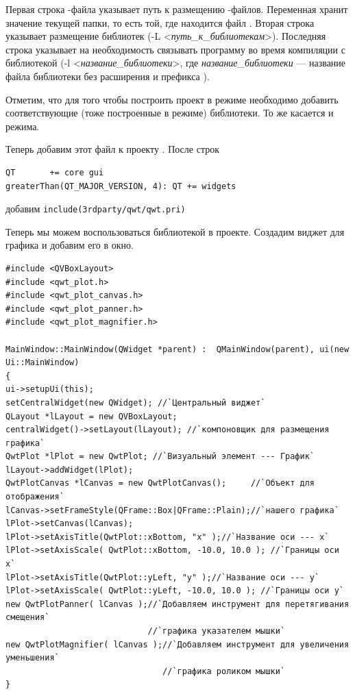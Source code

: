 Первая строка -файла указывает путь к размещению
-файлов. Переменная 
 хранит значение текущей папки, то есть той, где
находится файл . Вторая строка указывает размещение библиотек
(-L <\emph{путь\_к\_библиотекам}>). Последняя строка указывает на
необходимость связывать программу во время компиляции с библиотекой 
(-l <\emph{название\_библиотеки}>, где \emph{название\_библиотеки} ---
название файла библиотеки без расширения и префикса ).

Отметим, что для того чтобы построить проект в  режиме необходимо добавить соответствующие (тоже построенные в
 режиме) библиотеки. То же касается и  режима. 

Теперь добавим этот файл к проекту . После строк
\begin{lstlisting}
QT       += core gui
greaterThan(QT_MAJOR_VERSION, 4): QT += widgets
\end{lstlisting}
добавим \lstinline!include(3rdparty/qwt/qwt.pri)!

Теперь мы можем воспользоваться библиотекой  в проекте. Создадим виджет для графика и добавим его в окно.
\begin{lstlisting}
#include <QVBoxLayout>
#include <qwt_plot.h>
#include <qwt_plot_canvas.h>
#include <qwt_plot_panner.h>
#include <qwt_plot_magnifier.h>

MainWindow::MainWindow(QWidget *parent) :  QMainWindow(parent), ui(new Ui::MainWindow)
{
ui->setupUi(this);
setCentralWidget(new QWidget); //`Центральный виджет`
QLayout *lLayout = new QVBoxLayout;
centralWidget()->setLayout(lLayout); //`компоновщик для размещения графика`
QwtPlot *lPlot = new QwtPlot; //`Визуальный элемент --- График`
lLayout->addWidget(lPlot);
QwtPlotCanvas *lCanvas = new QwtPlotCanvas();     //`Объект для отображения`
lCanvas->setFrameStyle(QFrame::Box|QFrame::Plain);//`нашего графика`
lPlot->setCanvas(lCanvas);
lPlot->setAxisTitle(QwtPlot::xBottom, "x" );//`Название оси --- x`
lPlot->setAxisScale( QwtPlot::xBottom, -10.0, 10.0 ); //`Границы оси x`
lPlot->setAxisTitle(QwtPlot::yLeft, "y" );//`Название оси --- y`
lPlot->setAxisScale( QwtPlot::yLeft, -10.0, 10.0 ); //`Границы оси у`
new QwtPlotPanner( lCanvas );//`Добавляем инструмент для перетягивания смещения` 
                             //`графика указателем мышки`
new QwtPlotMagnifier( lCanvas );//`Добавляем инструмент для увеличения уменьшения`
                                //`графика роликом мышки`
}
\end{lstlisting}

